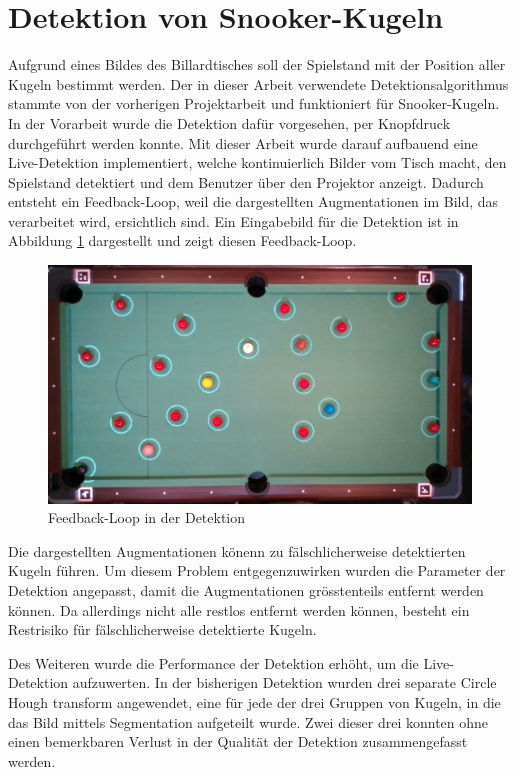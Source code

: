 \newpage
\section{Detektion von Snooker-Kugeln}\label{kap:detektion}
Aufgrund eines Bildes des Billardtisches soll der Spielstand mit der Position aller Kugeln bestimmt werden.
Der in dieser Arbeit verwendete Detektionsalgorithmus stammte von der vorherigen Projektarbeit\cite{project2:snooker_detection}
und funktioniert für Snooker-Kugeln.
In der Vorarbeit wurde die Detektion dafür vorgesehen, per Knopfdruck durchgeführt werden konnte.
Mit dieser Arbeit wurde darauf aufbauend eine Live-Detektion implementiert, welche kontinuierlich Bilder vom Tisch macht,
den Spielstand detektiert und dem Benutzer über den Projektor anzeigt.
Dadurch entsteht ein Feedback-Loop, weil die dargestellten Augmentationen im Bild, das verarbeitet wird, ersichtlich sind.
Ein Eingabebild für die Detektion ist in Abbildung \ref{fig:detection_feedback_loop} dargestellt und zeigt diesen Feedback-Loop.

\begin{figure}[h!]
    \begin{center}
        \includegraphics[width=0.8\linewidth]{../common/03_billiard_ai/resources/detection_feedback_loop.png}
    \end{center}
    \caption{Feedback-Loop in der Detektion}
    \label{fig:detection_feedback_loop}
\end{figure}

Die dargestellten Augmentationen könenn zu fälschlicherweise detektierten Kugeln führen.
Um diesem Problem entgegenzuwirken wurden die Parameter der Detektion angepasst, damit die Augmentationen grösstenteils
entfernt werden können. Da allerdings nicht alle restlos entfernt werden können, besteht ein Restrisiko für
fälschlicherweise detektierte Kugeln.

Des Weiteren wurde die Performance der Detektion erhöht, um die Live-Detektion aufzuwerten.
In der bisherigen Detektion wurden drei separate Circle Hough transform\cite{wiki:circle_hough} angewendet, eine für
jede der drei Gruppen von Kugeln, in die das Bild mittels Segmentation aufgeteilt wurde\cite{project2:snooker_detection}.
Zwei dieser drei konnten ohne einen bemerkbaren Verlust in der Qualität der Detektion zusammengefasst werden.
